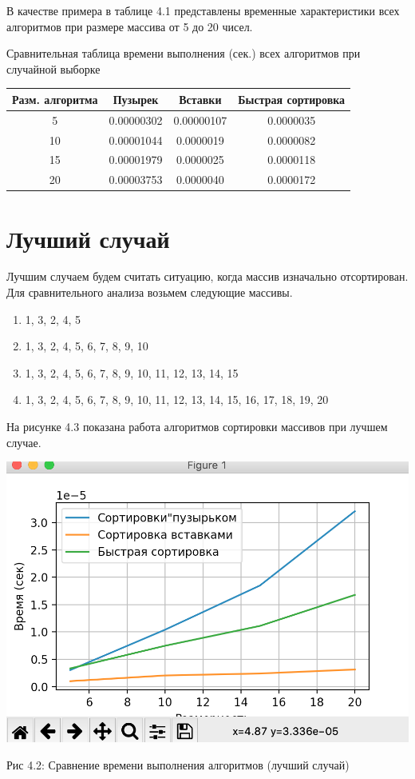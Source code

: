 \documentclass[12pt]{report}
\begin{document}
В качестве примера в таблице 4.1 представлены временные характеристики всех алгоритмов при размере массива от 5 до 20 чисел.

\begin{center}
	\centering
	\caption{Сравнительная таблица времени выполнения (сек.) всех алгоритмов при случайной выборке}
	\begin{tabular}{|c c c c|}
		\hline
		Разм. алгоритма & Пузырек & Вставки & Быстрая сортировка  \\ [0.5ex] 
 		\hline\hline
		5 & 0.00000302 & 0.00000107 & 0.0000035\\
 		\hline
 		10 & 0.00001044 & 0.0000019 & 0.0000082\\
 		\hline
 		15 & 0.00001979 & 0.0000025 & 0.0000118\\
 		\hline
		20 & 0.00003753 & 0.0000040 & 0.0000172\\
		\hline
		\end{tabular}
\end{center} 

\newpage
\section{Лучший случай}

Лучшим случаем будем считать ситуацию, когда массив изначально отсортирован. Для сравнительного анализа возьмем следующие массивы.
\begin{enumerate}
\item 1, 3, 2, 4, 5
\item 1, 3, 2, 4, 5, 6, 7, 8, 9, 10
\item 1, 3, 2, 4, 5, 6, 7, 8, 9, 10, 11, 12, 13, 14, 15
\item 1, 3, 2, 4, 5, 6, 7, 8, 9, 10, 11, 12, 13, 14, 15, 16, 17, 18, 19, 20
\end{enumerate}

На рисунке 4.3 показана работа алгоритмов сортировки массивов при лучшем случае.


\begin{center}
		\includegraphics[scale=0.6]{pics/Best.png}
		
			Рис 4.2: Сравнение времени выполнения алгоритмов (лучший случай)
\end{center}
\end{document}
